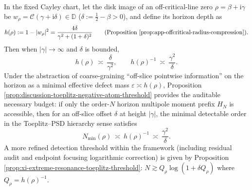 \begin{corollary}\label{cor:discussion-zk-area-law-gamma2-delta}
In the fixed Cayley chart, let the disk image of an off-critical-line zero \(\rho=\beta+\mathrm{i}\gamma\) be \(w_\rho=\mathcal{C}(\gamma+\mathrm{i}\delta)\in\mathbb{D}\) (\(\delta:=\tfrac12-\beta>0\)), and define its horizon depth as
\[
h(\rho):=1-|w_\rho|^2=\frac{4\delta}{\gamma^2+(1+\delta)^2}
\qquad\text{(Proposition \ref{prop:app-offcritical-radius-compression})}.
\]
Then when \(|\gamma|\to\infty\) and \(\delta\) is bounded,
\[
h(\rho)\ \asymp\ \frac{\delta}{\gamma^2},
\qquad
h(\rho)^{-1}\ \asymp\ \frac{\gamma^2}{\delta}.
\]
Under the abstraction of coarse-graining ``off-slice pointwise information'' on the horizon as a minimal effective defect mass \(\varepsilon\asymp h(\rho)\),
Proposition \ref{prop:discussion-toeplitz-negative-atom-threshold} provides the auditable necessary budget:
if only the order-\(N\) horizon multipole moment prefix \(H_N\) is accessible, then for an off-slice offset \(\delta\) at height \(|\gamma|\), the minimal detectable order in the Toeplitz--PSD hierarchy sense satisfies
\[
N_{\min}(\rho)\ \asymp\ h(\rho)^{-1}\ \asymp\ \frac{\gamma^2}{\delta}.
\]
A more refined detection threshold within the framework (including residual audit and endpoint focusing logarithmic correction) is given by Proposition \ref{prop:xi-extreme-resonance-toeplitz-threshold}:
\(
N\gtrsim Q_\rho\log(1+\delta Q_\rho)
\)
where \(Q_\rho=h(\rho)^{-1}\).
\end{corollary}

